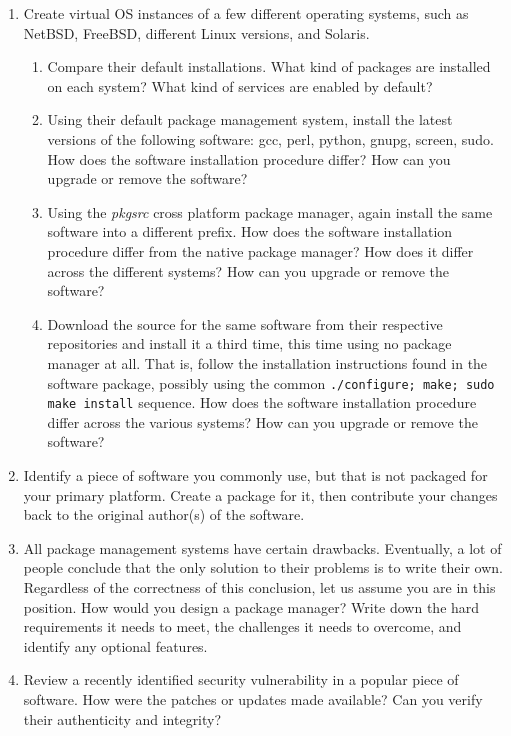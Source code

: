 \begin{enumerate}
\item
\label{prob:software-installation:pkg-vs-manual}
Create virtual OS instances of a few different operating systems, such as
NetBSD, FreeBSD, different Linux versions, and Solaris.

\begin{enumerate}
\item
Compare their default installations.  What kind of packages are installed
on each system?  What kind of services are enabled by default?

\item
Using their default package management system, install the latest versions
of the following software: gcc, perl, python, gnupg, screen, sudo.  How
does the software installation procedure differ?  How can you upgrade or
remove the software?

\item
Using the {\em pkgsrc} cross platform package manager, again install the
same software into a different prefix.  How does the software installation
procedure differ from the native package manager?  How does it differ
across the different systems?  How can you upgrade or remove the software?

\item
Download the source for the same software from their respective
repositories and install it a third time, this time using no package
manager at all.  That is, follow the installation instructions found in
the software package, possibly using the common {\tt ./configure; make;
sudo make install} sequence.  How does the software installation
procedure differ across the various systems?  How can you upgrade or
remove the software?
\end{enumerate}

\item
\label{prob:software-installation:build-a-package}
Identify a piece of software you commonly use, but that is not packaged
for your primary platform.  Create a package for it, then contribute your
changes back to the original author(s) of the software.

\item
All package management systems have certain drawbacks.  Eventually, a lot
of people conclude that the only solution to their problems is to write
their own.  Regardless of the correctness of this conclusion, let us
assume you are in this position.  How would you design a package manager?
Write down the hard requirements it needs to meet, the challenges it needs
to overcome, and identify any optional features.

\item
Review a recently identified security vulnerability in a popular piece of
software.  How were the patches or updates made available?  Can you verify
their authenticity and integrity?

\end{enumerate}

